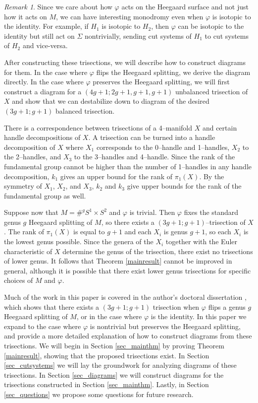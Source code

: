 \documentclass[12pt]{amsart}
\theoremstyle{definition}
\theoremstyle{remark}
\newtheorem{rem}[thm]{Remark}
\begin{document}
\begin{rem}
Since we care about how $\varphi$ acts on the Heegaard surface and not just how it acts on $M$, we can have interesting monodromy even when $\varphi$ is isotopic to the identity.  For example, if $H_1$ is isotopic to $H_2$, then $\varphi$ can be isotopic to the identity but still act on $\Sigma$ nontrivially, sending cut systems of $H_1$ to cut systems of $H_2$ and vice-versa.
\end{rem}

After constructing these trisections, we will describe how to construct diagrams for them.  In the case where $\varphi$ flips the Heegaard splitting, we derive the diagram directly.  In the case where $\varphi$ preserves the Heegaard splitting, we will first construct a diagram for a $(4g+1;2g+1,g+1,g+1)$ unbalanced trisection of $X$ and show that we can destabilize down to diagram of the desired $(3g+1;g+1)$ balanced trisection.

There is a correspondence between trisections of a 4--manifold $X$ and certain handle decompositions of $X$.  A trisection can be turned into a handle decomposition of $X$ where $X_1$ corresponds to the 0--handle and 1--handles, $X_2$ to the 2--handles, and $X_3$ to the 3--handles and 4--handle.  Since the rank of the fundamental group cannot be higher than the number of 1--handles in any handle decomposition, $k_1$ gives an upper bound for the rank of $\pi_1(X)$.  By the symmetry of $X_1$, $X_2$, and $X_3$, $k_2$ and $k_3$ give upper bounds for the rank of the fundamental group as well.  

Suppose now that $M = \#^g S^1 \times S^2$ and $\varphi$ is trivial.  Then $\varphi$ fixes the standard genus $g$ Heegaard splitting of $M$, so there exists a $(3g+1;g+1)$--trisection of $X$.  The rank of $\pi_1(X)$ is equal to $g+1$ and each $X_i$ is genus $g+1$,  so each $X_i$ is the lowest genus possible.  Since the genera of the $X_i$ together with the Euler characteristic of $X$ determine the genus of the trisection, there exist no trisections of lower genus.  It follows that Theorem \ref{mainresult} cannot be improved in general, although it is possible that there exist lower genus trisections for specific choices of $M$ and $\varphi$.

Much of the work in this paper is covered in the author's doctoral dissertation \cite{koenig1}, which shows that there exists a $(3g+1;g+1)$ trisection when $\varphi$ flips a genus $g$ Heegaard splitting of $M$, or in the case where $\varphi$ is the identity.  In this paper we expand to the case where $\varphi$ is nontrivial but preserves the Heegaard splitting, and provide a more detailed explanation of how to construct diagrams from these trisections.  We will begin in Section \ref{sec_mainthm} by proving Theorem \ref{mainresult}, showing that the proposed trisections exist.  In Section \ref{sec_cutsystems} we will lay the groundwork for analyzing diagrams of these trisections.  In Section \ref{sec_diagrams} we will construct diagrams for the trisections constructed in Section \ref{sec_mainthm}.  Lastly, in Section \ref{sec_questions} we propose some questions for future research.
\end{document}

